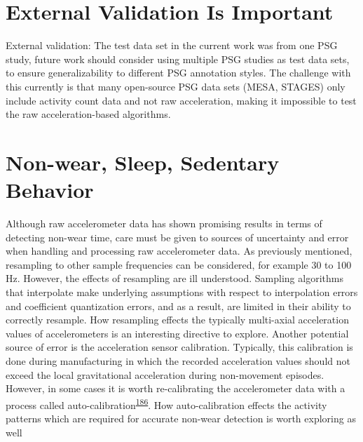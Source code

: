 \documentclass[
  10pt,
]{scrbook}
\begin{document}
\hypertarget{external-validation-is-important}{%
\section{External Validation Is
Important}\label{external-validation-is-important}}

External validation: The test data set in the current work was from one
PSG study, future work should consider using multiple PSG studies as
test data sets, to ensure generalizability to different PSG annotation
styles. The challenge with this currently is that many open-source PSG
data sets (MESA, STAGES) only include activity count data and not raw
acceleration, making it impossible to test the raw acceleration-based
algorithms.

\hypertarget{non-wear-sleep-sedentary-behavior}{%
\section{Non-wear, Sleep, Sedentary
Behavior}\label{non-wear-sleep-sedentary-behavior}}

Although raw accelerometer data has shown promising results in terms of
detecting non-wear time, care must be given to sources of uncertainty
and error when handling and processing raw accelerometer data. As
previously mentioned, resampling to other sample frequencies can be
considered, for example 30 to 100 Hz. However, the effects of resampling
are ill understood. Sampling algorithms that interpolate make underlying
assumptions with respect to interpolation errors and coefficient
quantization errors, and as a result, are limited in their ability to
correctly resample. How resampling effects the typically multi-axial
acceleration values of accelerometers is an interesting directive to
explore. Another potential source of error is the acceleration sensor
calibration. Typically, this calibration is done during manufacturing in
which the recorded acceleration values should not exceed the local
gravitational acceleration during non-movement episodes. However, in
some cases it is worth re-calibrating the accelerometer data with a
process called
auto-calibration\textsuperscript{\protect\hyperlink{ref-hees_2014}{186}}.
How auto-calibration effects the activity patterns which are required
for accurate non-wear detection is worth exploring as well
\end{document}
